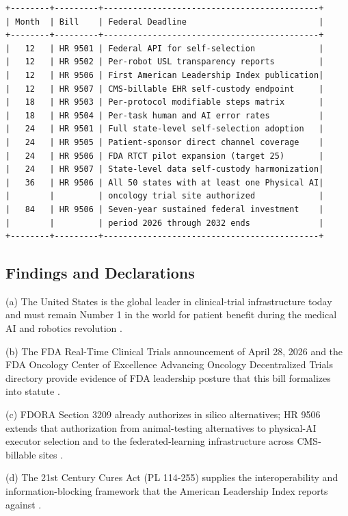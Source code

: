 \begin{verbatim}
+--------+---------+--------------------------------------------+
| Month  | Bill    | Federal Deadline                           |
+--------+---------+--------------------------------------------+
|   12   | HR 9501 | Federal API for self-selection             |
|   12   | HR 9502 | Per-robot USL transparency reports         |
|   12   | HR 9506 | First American Leadership Index publication|
|   12   | HR 9507 | CMS-billable EHR self-custody endpoint     |
|   18   | HR 9503 | Per-protocol modifiable steps matrix       |
|   18   | HR 9504 | Per-task human and AI error rates          |
|   24   | HR 9501 | Full state-level self-selection adoption   |
|   24   | HR 9505 | Patient-sponsor direct channel coverage    |
|   24   | HR 9506 | FDA RTCT pilot expansion (target 25)       |
|   24   | HR 9507 | State-level data self-custody harmonization|
|   36   | HR 9506 | All 50 states with at least one Physical AI|
|        |         | oncology trial site authorized             |
|   84   | HR 9506 | Seven-year sustained federal investment    |
|        |         | period 2026 through 2032 ends              |
+--------+---------+--------------------------------------------+
\end{verbatim}

\subsection{Findings and Declarations}

(a) The United States is the global leader in clinical-trial
infrastructure today and must remain Number 1 in the world for
patient benefit during the medical AI and robotics revolution
\cite{kawchak_2026_19244918, main_repo}.

(b) The FDA Real-Time Clinical Trials announcement of April 28,
2026 and the FDA Oncology Center of Excellence Advancing Oncology
Decentralized Trials directory provide evidence of FDA leadership
posture that this bill formalizes into statute
\cite{fda_rtct_press_2026, fda_oce_advancing_oncology_dct_2024}.

(c) FDORA Section 3209 already authorizes in silico alternatives;
HR 9506 extends that authorization from animal-testing alternatives
to physical-AI executor selection and to the federated-learning
infrastructure across CMS-billable sites
\cite{rank4_fdora_fda_modernization_2022}.

(d) The 21st Century Cures Act (PL 114-255) supplies the
interoperability and information-blocking framework that the
American Leadership Index reports against
\cite{rank1_cures_act_2016}.

